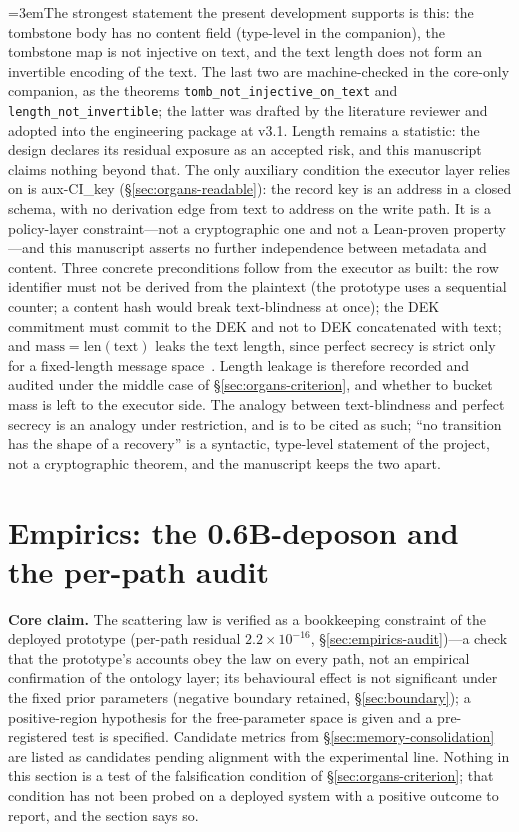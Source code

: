 \documentclass[11pt,a4paper]{article}
\newcommand{\thm}[1]{\nolinkurl{#1}}
\begin{document}
\begingroup\emergencystretch=3em\relax The strongest statement the present development supports is this: the tombstone body has no content field (type-level in the companion), the tombstone map is not injective on text, and the text length does not form an invertible encoding of the text. The last two are machine-checked in the core-only companion, as the theorems \thm{tomb_not_injective_on_text} and \thm{length_not_invertible}; the latter was drafted by the literature reviewer and adopted into the engineering package at v3.1. Length remains a statistic: the design declares its residual exposure as an accepted risk, and this manuscript claims nothing beyond that. The only auxiliary condition the executor layer relies on is aux-CI\_key (\S\ref{sec:organs-readable}): the record key is an address in a closed schema, with no derivation edge from text to address on the write path. It is a policy-layer constraint---not a cryptographic one and not a Lean-proven property---and this manuscript asserts no further independence between metadata and content. Three concrete preconditions follow from the executor as built: the row identifier must not be derived from the plaintext (the prototype uses a sequential counter; a content hash would break text-blindness at once); the DEK commitment must commit to the DEK and not to DEK concatenated with text; and $\mathrm{mass} = \mathrm{len}(\mathrm{text})$ leaks the text length, since perfect secrecy is strict only for a fixed-length message space~\cite{shannon1949}. Length leakage is therefore recorded and audited under the middle case of \S\ref{sec:organs-criterion}, and whether to bucket mass is left to the executor side. The analogy between text-blindness and perfect secrecy is an analogy under restriction, and is to be cited as such; ``no transition has the shape of a recovery'' is a syntactic, type-level statement of the project, not a cryptographic theorem, and the manuscript keeps the two apart.\par\endgroup

\section{Empirics: the 0.6B-deposon and the per-path audit}
\label{sec:empirics}

\textbf{Core claim.} The scattering law is verified as a bookkeeping constraint of the deployed prototype (per-path residual $2.2\times10^{-16}$, \S\ref{sec:empirics-audit})---a check that the prototype's accounts obey the law on every path, not an empirical confirmation of the ontology layer; its behavioural effect is not significant under the fixed prior parameters (negative boundary retained, \S\ref{sec:boundary}); a positive-region hypothesis for the free-parameter space is given and a pre-registered test is specified. Candidate metrics from \S\ref{sec:memory-consolidation} are listed as candidates pending alignment with the experimental line. Nothing in this section is a test of the falsification condition of \S\ref{sec:organs-criterion}; that condition has not been probed on a deployed system with a positive outcome to report, and the section says so.
\end{document}
